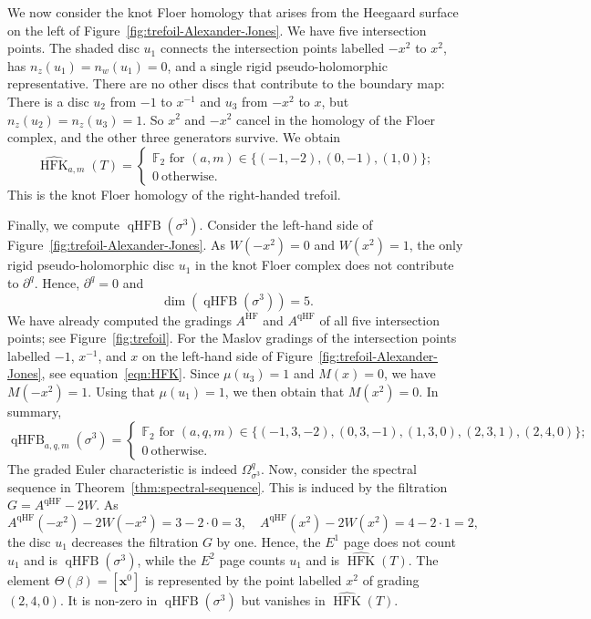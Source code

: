 \documentclass[11pt]{amsart}
\numberwithin{equation}{section}
\numberwithin{figure}{section}
\theoremstyle{definition}
\newcommand{\bF}{\mathbb{F}}
\DeclareMathOperator{\qHF}{qHF}
\DeclareMathOperator{\qHFB}{qHFB}
\DeclareMathOperator{\HF}{HF}
\DeclareMathOperator{\HFK}{HFK}
\newcommand{\HFKh}{\widehat{\HFK}}
\newcommand{\xs}{\boldsymbol{x}}
\begin{document}
We now consider the knot Floer homology that arises from the Heegaard surface on the left of Figure~\ref{fig:trefoil-Alexander-Jones}. We have five intersection points. The shaded disc $u_1$ connects the intersection points labelled $-x^2$ to $x^2$, has $n_z(u_1) = n_w(u_1) = 0$, and a single rigid pseudo-holomorphic representative. There are no other discs that contribute to the boundary map: There is a disc $u_2$ from $-1$ to $x^{-1}$ and $u_3$ from $-x^2$ to $x$, but $n_z(u_2) = n_z(u_3) = 1$. So $x^2$ and $-x^2$ cancel in the homology of the Floer complex, and the other three generators survive. We obtain
\begin{equation}\label{eqn:HFK}
  \HFKh_{a, m}(T)=
  \begin{cases}
        \bF_2 \text{ for } (a, m) \in \{(-1,-2),(0,-1),(1,0)\};\\
        0 \ \text{otherwise}.
    \end{cases}
\end{equation}
This is the knot Floer homology of the right-handed trefoil.

Finally, we compute $\qHFB(\sigma^3)$. Consider the left-hand side of Figure~\ref{fig:trefoil-Alexander-Jones}. As $W(-x^2) = 0$ and $W(x^2) = 1$, the only rigid pseudo-holomorphic disc $u_1$ in the knot Floer complex does not contribute to $\partial^q$. Hence, $\partial^q = 0$ and 
\[
\dim\left(\qHFB(\sigma^3)\right) = 5.
\]
We have already computed the gradings $A^{\HF}$ and $A^{\qHF}$ of all five intersection points; see Figure~\ref{fig:trefoil}. For the Maslov gradings of the intersection points labelled $-1$, $x^{-1}$, and $x$ on the left-hand side of Figure~\ref{fig:trefoil-Alexander-Jones}, see equation~\eqref{eqn:HFK}. Since $\mu(u_3) = 1$ and $M(x) = 0$, we have $M(-x^2) = 1$. Using that $\mu(u_1) = 1$, we then obtain that $M(x^2) = 0$. In summary,
\[
  \qHFB_{a,q,m}(\sigma^3)=
  \begin{cases}
        \bF_2 \text{ for } (a, q, m) \in \{(-1,3,-2), (0,3,-1), (1,3,0), (2,3,1),  (2,4,0)\};\\
        0 \ \text{otherwise}.
    \end{cases}
\]
The graded Euler characteristic is indeed $\Omega^q_{\sigma^3}$. Now, consider the spectral sequence in Theorem~\ref{thm:spectral-sequence}. This is induced by the filtration $G = A^{\qHF} - 2W$. As 
\[
A^{\qHF}(-x^2) - 2W(-x^2) = 3 - 2 \cdot 0 = 3, \quad A^{\qHF}(x^2) - 2W(x^2) = 4 - 2 \cdot 1 = 2, 
\]
the disc $u_1$ decreases the filtration $G$ by one. Hence, the $E^1$ page does not count $u_1$ and is $\qHFB(\sigma^3)$, while the $E^2$ page counts $u_1$ and is $\HFKh(T)$. The element $\Theta(\beta) = [\xs^0]$ is represented by the point labelled $x^2$ of grading $(2,4,0)$. It is non-zero in $\qHFB(\sigma^3)$ but vanishes in $\HFKh(T)$. 
\end{document}
